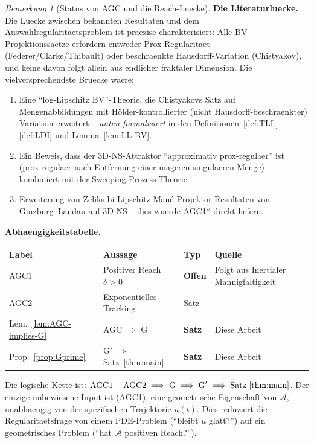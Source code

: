 \documentclass[12pt,a4paper]{article}
\theoremstyle{definition}
\theoremstyle{plain}
\theoremstyle{remark}
\newtheorem{remark}[definition]{Bemerkung}
\begin{document}
\begin{remark}[Status von AGC und die Reach-Luecke]
\noindent
\textbf{Die Literaturluecke.}\;
Die Luecke zwischen bekannten Resultaten und dem Auswahlregularitaetsproblem ist
praezise charakterisiert: Alle BV-Projektionssaetze erfordern entweder
Prox-Regularitaet (Federer/Clarke/Thibault) oder beschraenkte Hausdorff-Variation
(Chistyakov), und keine davon folgt allein aus endlicher fraktaler Dimension.
Die vielversprechendste Bruecke waere:
\begin{enumerate}
  \item Eine ``log-Lipschitz BV''-Theorie, die Chistyakovs Satz auf
    Mengenabbildungen mit H\"older-kontrollierter (nicht Hausdorff-beschraenkter)
    Variation erweitert -- \emph{unten formalisiert} in
    den Definitionen~\ref{def:TLL}--\ref{def:LDI} und
    Lemma~\ref{lem:LL-BV}.
  \item Ein Beweis, dass der 3D-NS-Attraktor ``approximativ
    prox-regulaer'' ist (prox-regulaer nach Entfernung einer mageren singulaeren
    Menge) -- kombiniert mit der Sweeping-Prozess-Theorie.
  \item Erweiterung von Zeliks bi-Lipschitz Man\'e-Projektor-Resultaten
    von Ginzburg--Landau auf 3D NS -- dies wuerde AGC1$''$
    direkt liefern.
\end{enumerate}

\medskip\noindent
\textbf{Abhaengigkeitstabelle.}
\medskip

\begin{center}
\begin{tabular}{llll}
\hline
\textbf{Label} & \textbf{Aussage} & \textbf{Typ} & \textbf{Quelle} \\
\hline
AGC1 & Positiver Reach $\delta > 0$ & \textbf{Offen} &
  Folgt aus Inertialer Mannigfaltigkeit \\
AGC2 & Exponentielles Tracking & Satz &
  \cite{Temam2001} \\
Lem.~\ref{lem:AGC-implies-G} & AGC $\Rightarrow$ G &
  \textbf{Satz} & Diese Arbeit \\
Prop.~\ref{prop:Gprime} & G$'$ $\Rightarrow$
  Satz~\ref{thm:main} & \textbf{Satz} & Diese Arbeit \\
\hline
\end{tabular}
\end{center}

\medskip\noindent
Die logische Kette ist:
$\textup{AGC1} + \textup{AGC2}
\;\Longrightarrow\;
\textup{G}
\;\Longrightarrow\;
\textup{G}'
\;\Longrightarrow\;
\textup{Satz~\ref{thm:main}}$.
Der einzige unbewiesene Input ist \textup{(AGC1)}, eine geometrische
Eigenschaft von $\mathcal{A}$, unabhaengig von der spezifischen Trajektorie
$u(t)$. Dies reduziert die Regularitaetsfrage von einem PDE-Problem
(``bleibt $u$ glatt?'') auf ein geometrisches Problem (``hat
$\mathcal{A}$ positiven Reach?'').
\end{remark}
\end{document}
